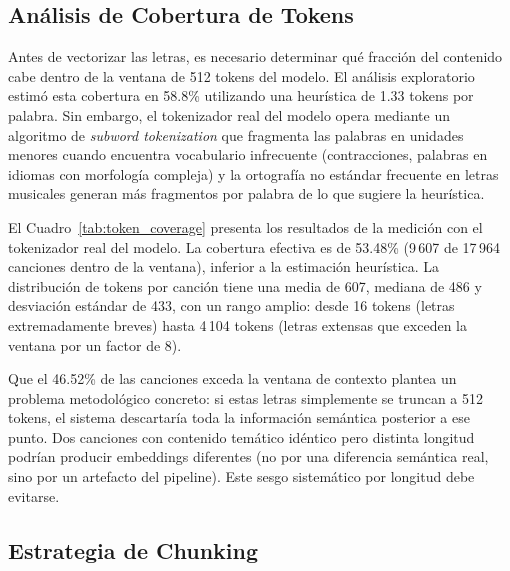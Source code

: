 \subsection{Análisis de Cobertura de Tokens}
\label{subsec:cobertura-tokens}

Antes de vectorizar las letras, es necesario determinar qué fracción del contenido cabe dentro de la ventana de 512 tokens del modelo. El análisis exploratorio estimó esta cobertura en 58.8\% utilizando una heurística de 1.33 tokens por palabra. Sin embargo, el tokenizador real del modelo opera mediante un algoritmo de \textit{subword tokenization} que fragmenta las palabras en unidades menores cuando encuentra vocabulario infrecuente (contracciones, palabras en idiomas con morfología compleja) y la ortografía no estándar frecuente en letras musicales generan más fragmentos por palabra de lo que sugiere la heurística.



El Cuadro~\ref{tab:token_coverage} presenta los resultados de la medición con el tokenizador real del modelo. La cobertura efectiva es de 53.48\% (9\,607 de 17\,964 canciones dentro de la ventana), inferior a la estimación heurística. La distribución de tokens por canción tiene una media de 607, mediana de 486 y desviación estándar de 433, con un rango amplio: desde 16 tokens (letras extremadamente breves) hasta 4\,104 tokens (letras extensas que exceden la ventana por un factor de 8).

Que el 46.52\% de las canciones exceda la ventana de contexto plantea un problema metodológico concreto: si estas letras simplemente se truncan a 512 tokens, el sistema descartaría toda la información semántica posterior a ese punto. Dos canciones con contenido temático idéntico pero distinta longitud podrían producir embeddings diferentes (no por una diferencia semántica real, sino por un artefacto del pipeline). Este sesgo sistemático por longitud debe evitarse.

\subsection{Estrategia de Chunking}
\label{subsec:chunking}

